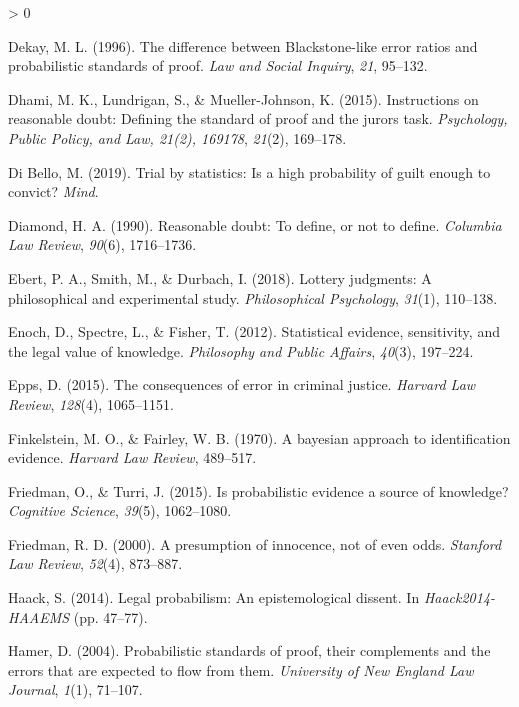 \documentclass[
  10pt,
  dvipsnames,enabledeprecatedfontcommands]{scrartcl}
\newlength{\cslhangindent}
\newenvironment{CSLReferences}[2] %
 {%
  \setlength{\parindent}{0pt}
  \ifodd #1 \everypar{\setlength{\hangindent}{\cslhangindent}}\ignorespaces\fi
  \ifnum #2 > 0
  \setlength{\parskip}{#2\baselineskip}
  \fi
 }%
 {}
\begin{document}
\begin{CSLReferences}{1}{0}
\leavevmode\hypertarget{ref-Dekay1996}{}%
Dekay, M. L. (1996). The difference between {B}lackstone-like error
ratios and probabilistic standards of proof. \emph{Law and Social
Inquiry}, \emph{21}, 95--132.

\leavevmode\hypertarget{ref-dhamiEtAl2015}{}%
Dhami, M. K., Lundrigan, S., \& Mueller-Johnson, K. (2015). Instructions
on reasonable doubt: Defining the standard of proof and the jurors task.
\emph{Psychology, Public Policy, and Law, 21(2), 169178}, \emph{21}(2),
169--178.

\leavevmode\hypertarget{ref-diBello2019}{}%
Di Bello, M. (2019). Trial by statistics: Is a high probability of guilt
enough to convict? \emph{Mind}.

\leavevmode\hypertarget{ref-diamond90}{}%
Diamond, H. A. (1990). Reasonable doubt: To define, or not to define.
\emph{Columbia Law Review}, \emph{90}(6), 1716--1736.

\leavevmode\hypertarget{ref-ebert2018}{}%
Ebert, P. A., Smith, M., \& Durbach, I. (2018). Lottery judgments: A
philosophical and experimental study. \emph{Philosophical Psychology},
\emph{31}(1), 110--138.

\leavevmode\hypertarget{ref-Enoch2012Statistical}{}%
Enoch, D., Spectre, L., \& Fisher, T. (2012). Statistical evidence,
sensitivity, and the legal value of knowledge. \emph{Philosophy and
Public Affairs}, \emph{40}(3), 197--224.

\leavevmode\hypertarget{ref-epps2015}{}%
Epps, D. (2015). The consequences of error in criminal justice.
\emph{Harvard Law Review}, \emph{128}(4), 1065--1151.

\leavevmode\hypertarget{ref-finkelstein1970bayesian}{}%
Finkelstein, M. O., \& Fairley, W. B. (1970). A bayesian approach to
identification evidence. \emph{Harvard Law Review}, 489--517.

\leavevmode\hypertarget{ref-friedman2015}{}%
Friedman, O., \& Turri, J. (2015). Is probabilistic evidence a source of
knowledge? \emph{Cognitive Science}, \emph{39}(5), 1062--1080.

\leavevmode\hypertarget{ref-Friedman2000presumption}{}%
Friedman, R. D. (2000). A presumption of innocence, not of even odds.
\emph{Stanford Law Review}, \emph{52}(4), 873--887.

\leavevmode\hypertarget{ref-haack2011legal}{}%
Haack, S. (2014). Legal probabilism: An epistemological dissent. In
\emph{{Haack2014-HAAEMS}} (pp. 47--77).

\leavevmode\hypertarget{ref-hamer2004}{}%
Hamer, D. (2004). Probabilistic standards of proof, their complements
and the errors that are expected to flow from them. \emph{University of
New England Law Journal}, \emph{1}(1), 71--107.


\end{CSLReferences}
\end{document}
